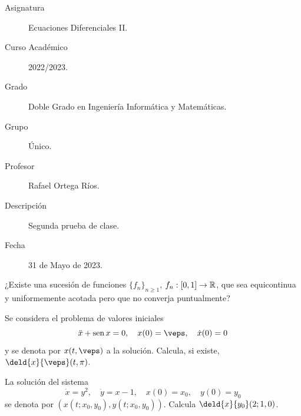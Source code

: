 \documentclass[12pt]{article}
\begin{document}

    
    

    \begin{description}
        \item[Asignatura] Ecuaciones Diferenciales II.
        \item[Curso Académico] 2022/2023.
        \item[Grado] Doble Grado en Ingeniería Informática y Matemáticas.
        \item[Grupo] Único.
        \item[Profesor] Rafael Ortega Ríos.
        \item[Descripción] Segunda prueba de clase.
        \item[Fecha] 31 de Mayo de 2023.
    
    \end{description}
    \newpage


    
    \begin{ejercicio}
        ¿Existe una sucesión de funciones $\{f_n\}_{n \geq 1}$, $f_n : \left[0, 1\right] \to \mathbb{R}$, que sea equicontinua y uniformemente acotada pero que no converja puntualmente?
    \end{ejercicio}

    \begin{ejercicio}
        Se considera el problema de valores iniciales
        \[
        \ddot{x} + \operatorname{sen} x = 0, \quad x(0) = \veps, \quad \dot{x}(0) = 0
        \]
        y se denota por $x(t, \veps)$ a la solución. Calcula, si existe, $\deld{x}{\veps}(t, \pi)$.
    \end{ejercicio}

    \begin{ejercicio}
        La solución del sistema
        \[
        \dot{x} = y^2, \quad \dot{y} = x - 1, \quad x(0) = x_0, \quad y(0) = y_0
        \]
        se denota por $(x(t; x_0, y_0), y(t; x_0, y_0))$. Calcula $\deld{x}{y_0}(2; 1, 0)$.
    \end{ejercicio}
\end{document}
